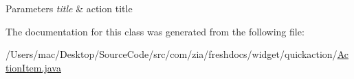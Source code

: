 \begin{DoxyParams}{Parameters}
{\em title} & action title \\
\hline
\end{DoxyParams}


The documentation for this class was generated from the following file\-:\begin{DoxyCompactItemize}
\item 
/\-Users/mac/\-Desktop/\-Source\-Code/src/com/zia/freshdocs/widget/quickaction/\hyperlink{_action_item_8java}{Action\-Item.\-java}\end{DoxyCompactItemize}
